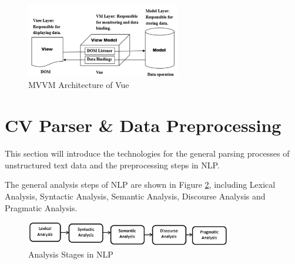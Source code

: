  \begin{figure}[H]
    \centering
    \includegraphics[width=0.6\textwidth]{images/MVVM.png}
    \caption{MVVM Architecture of Vue \cite{li2021research}}
    \label{fig:4}
\end{figure}


\section{CV Parser \& Data Preprocessing}
\label{method_preprocessing}


This section will introduce the technologies for the general parsing processes of unstructured text data and the preprocessing steps in NLP.

The general analysis steps of NLP are shown in Figure \ref{fig:5}, including Lexical Analysis, Syntactic Analysis, Semantic Analysis, Discourse Analysis and Pragmatic Analysis.

 \begin{figure}[H]
    \centering
    \includegraphics[width=0.8\textwidth]{images/preprocessing_step.png}
    \caption{Analysis Stages in NLP \cite{yogish2018review}}
    \label{fig:5}
\end{figure}


